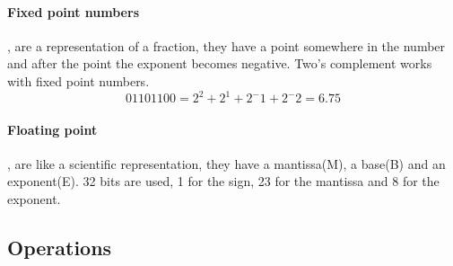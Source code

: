 	\paragraph{Fixed point numbers}, are a representation of a fraction, they have a point somewhere in the number and after the point the exponent becomes negative. Two's complement works with fixed point numbers.
	\begin{equation}
		01101100 = 2^2+2^1+2^-1+2^-2 = 6.75
	\end{equation}
	\paragraph{Floating point}, are like a scientific representation, they have a mantissa(M), a base(B) and an exponent(E). 32 bits are used, 1 for the sign, 23 for the mantissa and 8 for the exponent.

	
	\vspace{8mm}
	\subsection{Operations}
	
